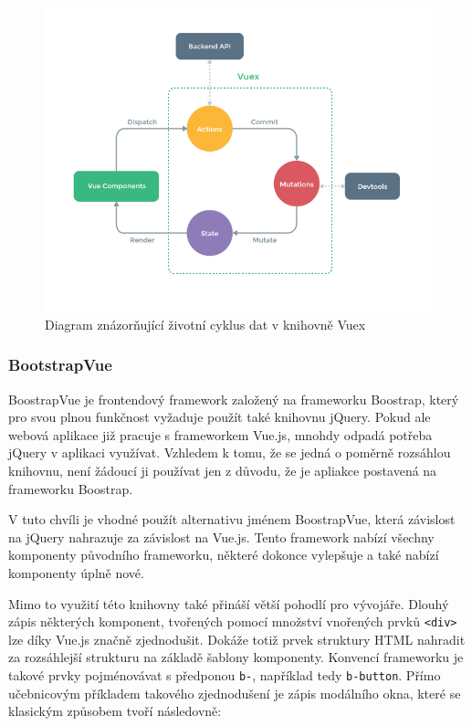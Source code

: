 \begin{figure}[H]
	\centering
	\includegraphics[width=\textwidth]{images/vuex.png}
	\caption{Diagram znázorňující životní cyklus dat v knihovně Vuex}
	\label{vuex-dataflow}
\end{figure}

\blindtext

\subsubsection*{BootstrapVue}
BoostrapVue je frontendový framework založený na frameworku Boostrap, který pro svou plnou funkčnost vyžaduje použít také knihovnu jQuery. Pokud ale webová aplikace již pracuje s frameworkem Vue.js, mnohdy odpadá potřeba jQuery v aplikaci využívat. Vzhledem k tomu, že se jedná o poměrně rozsáhlou knihovnu, není žádoucí ji používat jen z důvodu, že je apliakce postavená na frameworku Boostrap.

V tuto chvíli je vhodné použít alternativu jménem BoostrapVue, která závislost na jQuery nahrazuje za závislost na Vue.js. Tento framework nabízí všechny komponenty původního frameworku, některé dokonce vylepšuje a také nabízí komponenty úplně nové.

Mimo to využití této knihovny také přináší větší pohodlí pro vývojáře. Dlouhý zápis některých komponent, tvořených pomocí množství vnořených prvků \texttt{<div>} lze díky Vue.js značně zjednodušit. Dokáže totiž prvek struktury HTML nahradit za rozsáhlejší strukturu na základě šablony komponenty. Konvencí frameworku je takové prvky pojménovávat s předponou \texttt{b-}, například tedy \texttt{b-button}.
Přímo učebnicovým příkladem takového zjednodušení je zápis modálního okna, které se klasickým způsobem tvoří následovně:

